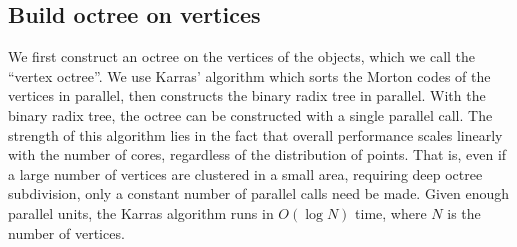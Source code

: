 \documentclass{egpubl}
\begin{document}
%
%

\subsection{Build octree on vertices}

We first construct an octree on the vertices of the objects, which we call the ``vertex octree''. We use Karras' algorithm \cite{karras2012maximizing} which sorts the Morton codes of the vertices in parallel, then constructs the binary radix tree in parallel. With the binary radix tree, the octree can be constructed with a single parallel call. The strength of this algorithm lies in the fact that overall performance scales linearly with the number of cores, regardless of the distribution of points. That is, even if a large number of vertices are clustered in a small area, requiring deep octree subdivision, only a constant number of parallel calls need be made. Given enough parallel units, the Karras algorithm runs in $O(\log{N})$ time, where $N$ is the number of vertices.
\end{document}
